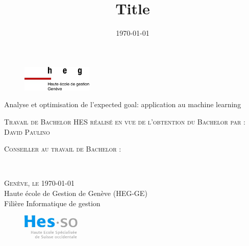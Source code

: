 \documentclass[12pt]{article}
\title{Title}
\author{\DP}
\date{\today}
\newcommand{\DP}{David Paulino}
\newcommand{\place}{Genève}
\newcommand{\fulltitle}{Analyse et optimisation de l'expected goal: application au machine learning}
\begin{document}
\begin{titlepage}

    \begin{figure}[h]
        \includegraphics[width=0.3\textwidth]{img/logo_heg-ge.jpg}
    \end{figure}

    \vspace*{0.5cm}

    \begin{center}

        \begingroup \linespread{1,75} \selectfont
        {\Large \fulltitle}\\[0,75cm]
        \endgroup



        \vspace{1.5cm}

        \textsc{\large Travail de Bachelor HES réalisé en vue de \newline l’obtention du Bachelor par :}\\[0,50cm]

        \begingroup \linespread{1,75} \selectfont
        \textsc{\large \DP}\\[0,50cm]
        \endgroup


        \vspace{1cm}


        \textsc{\large Conseiller au travail de Bachelor : }

        \begingroup \linespread{1,75} \selectfont
        \textsc{}\\[1cm]
        \endgroup


        \begingroup \linespread{1,75} \selectfont
        \textsc{\large \place, le \today}\\[0,25cm]

        {\large Haute école de Gestion de Genève (HEG-GE)}\\[0,25cm]

        {\large Filière Informatique de gestion}\\[0,25cm]
        \endgroup



        \begin{figure}[h]
            \vspace*{1cm}
            \hspace*{12cm}\includegraphics[width=0.25\textwidth]{img/logo_hes-so.jpg}
        \end{figure}

    \end{center}



    \vfill
\end{titlepage}
\end{document}
